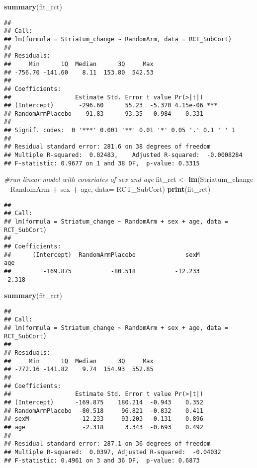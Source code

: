 \documentclass[]{article}
\newenvironment{Shaded}{\begin{snugshade}}{\end{snugshade}}
\newcommand{\KeywordTok}[1]{\textcolor[rgb]{0.13,0.29,0.53}{\textbf{#1}}}
\newcommand{\DataTypeTok}[1]{\textcolor[rgb]{0.13,0.29,0.53}{#1}}
\newcommand{\StringTok}[1]{\textcolor[rgb]{0.31,0.60,0.02}{#1}}
\newcommand{\CommentTok}[1]{\textcolor[rgb]{0.56,0.35,0.01}{\textit{#1}}}
\newcommand{\OperatorTok}[1]{\textcolor[rgb]{0.81,0.36,0.00}{\textbf{#1}}}
\newcommand{\NormalTok}[1]{#1}
\theoremstyle{definition}
\theoremstyle{definition}
\theoremstyle{definition}
\theoremstyle{remark}
\begin{document}
\begin{Shaded}
\begin{Highlighting}[]
  \KeywordTok{summary}\NormalTok{(fit_rct)}
\end{Highlighting}
\end{Shaded}

\begin{verbatim}
## 
## Call:
## lm(formula = Striatum_change ~ RandomArm, data = RCT_SubCort)
## 
## Residuals:
##     Min      1Q  Median      3Q     Max 
## -756.70 -141.60    8.11  153.80  542.53 
## 
## Coefficients:
##                  Estimate Std. Error t value Pr(>|t|)    
## (Intercept)       -296.60      55.23  -5.370 4.15e-06 ***
## RandomArmPlacebo   -91.83      93.35  -0.984    0.331    
## ---
## Signif. codes:  0 '***' 0.001 '**' 0.01 '*' 0.05 '.' 0.1 ' ' 1
## 
## Residual standard error: 281.6 on 38 degrees of freedom
## Multiple R-squared:  0.02483,    Adjusted R-squared:  -0.0008284 
## F-statistic: 0.9677 on 1 and 38 DF,  p-value: 0.3315
\end{verbatim}

\begin{Shaded}
\begin{Highlighting}[]
\CommentTok{#run linear model with covariates of sex and age}
\NormalTok{  fit_rct <-}\StringTok{ }\KeywordTok{lm}\NormalTok{(Striatum_change }\OperatorTok{~}\StringTok{ }\NormalTok{RandomArm }\OperatorTok{+}\StringTok{ }\NormalTok{sex }\OperatorTok{+}\StringTok{ }\NormalTok{age, }\DataTypeTok{data=}\NormalTok{ RCT_SubCort)}
  \KeywordTok{print}\NormalTok{(fit_rct)}
\end{Highlighting}
\end{Shaded}

\begin{verbatim}
## 
## Call:
## lm(formula = Striatum_change ~ RandomArm + sex + age, data = RCT_SubCort)
## 
## Coefficients:
##      (Intercept)  RandomArmPlacebo              sexM               age  
##         -169.875           -80.518           -12.233            -2.318
\end{verbatim}

\begin{Shaded}
\begin{Highlighting}[]
  \KeywordTok{summary}\NormalTok{(fit_rct)}
\end{Highlighting}
\end{Shaded}

\begin{verbatim}
## 
## Call:
## lm(formula = Striatum_change ~ RandomArm + sex + age, data = RCT_SubCort)
## 
## Residuals:
##     Min      1Q  Median      3Q     Max 
## -772.16 -141.82    9.74  154.93  552.85 
## 
## Coefficients:
##                  Estimate Std. Error t value Pr(>|t|)
## (Intercept)      -169.875    180.214  -0.943    0.352
## RandomArmPlacebo  -80.518     96.821  -0.832    0.411
## sexM              -12.233     93.203  -0.131    0.896
## age                -2.318      3.343  -0.693    0.492
## 
## Residual standard error: 287.1 on 36 degrees of freedom
## Multiple R-squared:  0.0397, Adjusted R-squared:  -0.04032 
## F-statistic: 0.4961 on 3 and 36 DF,  p-value: 0.6873
\end{verbatim}
\end{document}
